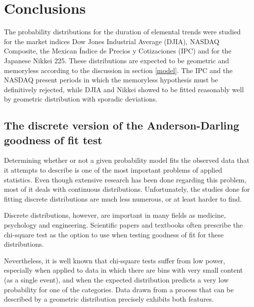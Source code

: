 \documentclass[a4paper]{jpconf}
\begin{document}
\section{Conclusions}
The probability distributions for the duration of elemental trends were studied for the market indices Dow Jones Industrial Average (DJIA), NASDAQ Composite, the Mexican \'Indice de Precios y Cotizaciones (IPC) and for the Japanese Nikkei 225. These distributions are expected to be geometric and memoryless according to the discussion in section \ref{model}. The IPC and the NASDAQ present periods in which the memoryless hypothesis must be definitively rejected, while DJIA and Nikkei showed to be fitted reasonably well by geometric distribution with sporadic deviations.

\clearpage

\begin{appendices}
\addappheadtotoc
\appendixpage
  
\section*{The discrete version of the Anderson-Darling goodness of fit test}
\label{apendice}

Determining whether or not a given probability model fits the observed data that it attempts to describe is one of the most important problems of applied statistics. Even though extensive research has been done regarding this problem, most of it deals with continuous distributions. Unfortunately, the studies done for fitting discrete distributions are much less numerous, or at least harder to find.

Discrete distributions, however, are important in many fields as medicine, psychology and engineering. Scientific papers and textbooks often prescribe the chi-square test as the option to use when testing goodness of fit for these distributions.
 
Nevertheless, it is well known that chi-square tests suffer from low power, especially when applied to data in which there are bins with very small content (as a single event), and when the expected distribution predicts a very low probability for one of the categories. Data drawn from a process that can be described by a geometric distribution precisely exhibits both features.


\end{appendices}
\end{document}
